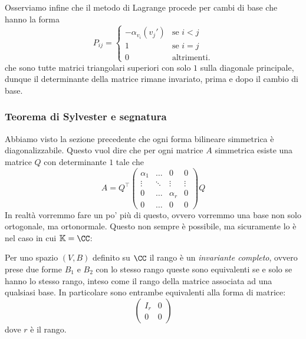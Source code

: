 \documentclass[11pt]{scrartcl}
\newcommand{\KK}{\mathbb{K}}
\begin{document}
	Osserviamo infine che il metodo di Lagrange procede per cambi di base che hanno la forma
	$$P_{ij}=
	\begin{cases}
		-\alpha_{v_i}(v_j') & \text{se $i<j$} \\
		1 & \text{se $i=j$} \\
		0 & \text{altrimenti.}
	\end{cases}
	$$
	che sono tutte matrici triangolari superiori con solo $1$ sulla diagonale principale, dunque il determinante della matrice rimane invariato, prima e dopo il cambio di base.
	
	\subsubsection{Teorema di Sylvester e segnatura}
	
	Abbiamo visto la sezione precedente che ogni forma bilineare simmetrica è diagonalizzabile. Questo vuol dire che per ogni matrice $A$ simmetrica esiste una matrice $Q$ con determinante $1$ tale che
	$$A=Q^\intercal
	\left(
	\begin{array}{ccc|c}
		\alpha_1 & \dots & 0 & 0 \\
		\vdots & \ddots & \vdots & \vdots \\
		0 & \dots & \alpha_r & 0 \\
		\hline
		0 & \dots & 0 & 0
	\end{array}
	\right)
	Q
	$$
	In realtà vorremmo fare un po' più di questo, ovvero vorremmo una base non solo ortogonale, ma ortonormale. Questo non sempre è possibile, ma sicuramente lo è nel caso in cui $\KK=\CC$:
	\begin{corollary}
		Per uno spazio $(V,B)$ definito su $\CC$ il rango è un \textit{invariante completo}, ovvero prese due forme $B_1$ e $B_2$ con lo stesso rango queste sono equivalenti se e solo se hanno lo stesso rango, inteso come il rango della matrice associata ad una qualsiasi base. In particolare sono entrambe equivalenti alla forma di matrice:
		$$
		\left(
		\begin{array}{c|c}
			I_r & 0 \\
			\hline 
			0 & 0
		\end{array}
		\right)
		$$
		dove $r$ è il rango.
	\end{corollary}
\end{document}
